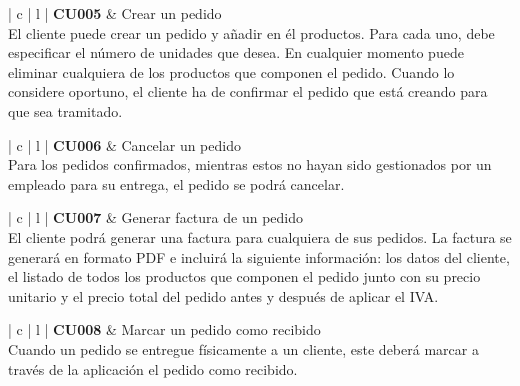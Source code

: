 \documentclass[11pt,spanish,listoffigures]{tfgetsinf}
\begin{document}
\begin{center}
\begin{tabular}{ | c | l | }
\hline
\textbf{ CU005 } & Crear un pedido \\
\hline
{}
{
El cliente puede crear un pedido y añadir en él productos. Para cada uno, debe especificar el número de unidades que desea. En cualquier momento puede eliminar cualquiera de los productos que componen el pedido. Cuando lo considere oportuno, el cliente ha de confirmar el pedido que está creando para que sea tramitado.
} \\
\hline
\end{tabular}
\end{center}

\begin{center}
\begin{tabular}{ | c | l | }
\hline
\textbf{ CU006 } & Cancelar un pedido \\
\hline
{}
{
Para los pedidos confirmados, mientras estos no hayan sido gestionados por un empleado para su entrega, el pedido se podrá cancelar.
} \\
\hline
\end{tabular}
\end{center}

\begin{center}
\begin{tabular}{ | c | l | }
\hline
\textbf{ CU007 } & Generar factura de un pedido \\
\hline
{}
{
El cliente podrá generar una factura para cualquiera de sus pedidos. La factura se generará en formato PDF e incluirá la siguiente información: los datos del cliente, el listado de todos los productos que componen el pedido junto con su precio unitario y el precio total del pedido antes y después de aplicar el IVA.
} \\
\hline
\end{tabular}
\end{center}

\begin{center}
\begin{tabular}{ | c | l | }
\hline
\textbf{ CU008 } & Marcar un pedido como recibido \\
\hline
{}
{
Cuando un pedido se entregue físicamente a un cliente, este deberá marcar a través de la aplicación el pedido como recibido.
} \\
\hline
\end{tabular}
\end{center}
\end{document}
